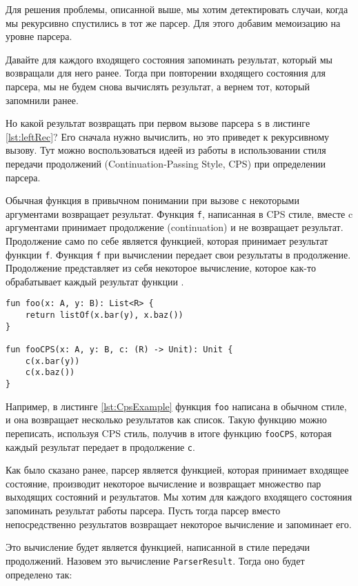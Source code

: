 Для решения проблемы, описанной выше, мы хотим детектировать случаи, когда мы рекурсивно спустились в тот же парсер. Для этого добавим мемоизацию на уровне парсера.

Давайте для каждого входящего состояния запоминать результат, который мы возвращали для него ранее. Тогда при повторении входящего состояния для парсера, мы не будем снова вычислять результат, а вернем тот, который запомнили ранее.

Но какой результат возвращать при первом вызове парсера \texttt{s} в листинге \ref{lst:leftRec}?
Его сначала нужно вычислить, но это приведет к рекурсивному вызову.
Тут можно воспользоваться идеей из работы \cite{MemoizationJohnson} в использовании стиля передачи продолжений (Continuation-Passing Style, CPS) при определении парсера.

Обычная функция в привычном понимании при вызове с некоторыми аргументами возвращает результат. Функция \texttt{f}, написанная в CPS стиле, вместе c аргументами принимает продолжение (continuation) и не возвращает результат. Продолжение само по себе является функцией, которая принимает результат функции \texttt{f}. Функция \texttt{f} при вычислении передает свои результаты в продолжение. Продолжение представляет из себя некоторое вычисление, которое как-то обрабатывает каждый результат функции .

\begin{lstlisting}[float=ht, label={lst:CpsExample}, caption=Пример функции в CPS стиле]
fun foo(x: A, y: B): List<R> {
    return listOf(x.bar(y), x.baz())
}

fun fooCPS(x: A, y: B, c: (R) -> Unit): Unit {
    c(x.bar(y))
    c(x.baz())
}
\end{lstlisting}

Например, в листинге \ref{lst:CpsExample} функция \texttt{foo} написана в обычном стиле, и она возвращает несколько результатов как список. Такую функцию можно переписать, используя CPS стиль, получив в итоге функцию \texttt{fooCPS}, которая каждый результат передает в продолжение \texttt{c}.

Как было сказано ранее, парсер является функцией, которая принимает входящее состояние, производит некоторое вычисление и возвращает множество пар выходящих состояний и результатов. Мы хотим для каждого входящего состояния запоминать результат работы парсера. Пусть тогда парсер вместо непосредственно результатов возвращает некоторое вычисление и запоминает его.

Это вычисление будет является функцией, написанной в стиле передачи продолжений. Назовем это вычисление \texttt{ParserResult}. Тогда оно будет определено так:

